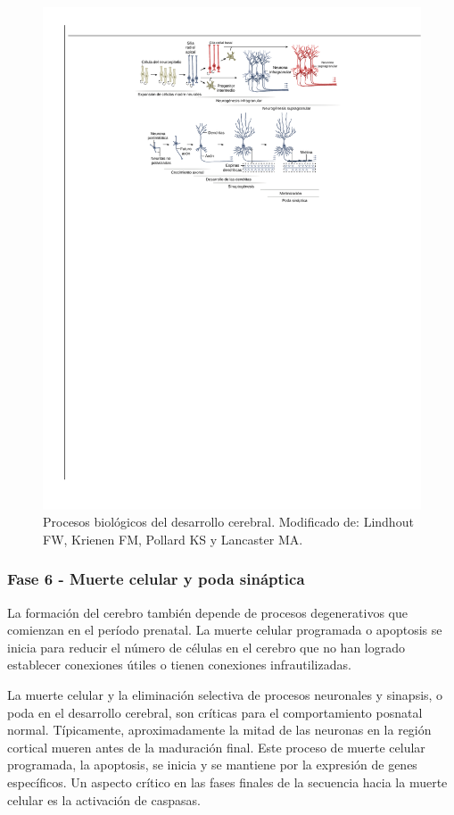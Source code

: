 \documentclass[11pt,letterpaper]{report}
\begin{document}
\begin{figure}[h]
    \centering
    \includegraphics[width=1\textwidth]{embriologiacerebral}
	\captionsetup{font=footnotesize}
    \caption{Procesos biológicos del desarrollo cerebral. Modificado de:
	Lindhout FW, Krienen FM, Pollard KS y Lancaster MA. \cite{Lindhout2024}}
    \label{fig:embriologiacerebral}
\end{figure}

\subsubsection{Fase 6 - Muerte celular y poda sináptica}
La formación del cerebro también depende de procesos degenerativos que
comienzan en el período prenatal. La muerte celular programada o apoptosis se
inicia para reducir el número de células en el cerebro que no han logrado
establecer conexiones útiles o tienen conexiones infrautilizadas.
\cite{Gibb2018}

La muerte celular y la eliminación selectiva de procesos neuronales y sinapsis,
o poda en el desarrollo cerebral, son críticas para el comportamiento posnatal
normal. Típicamente, aproximadamente la mitad de las neuronas en la región
cortical mueren antes de la maduración final. Este proceso de muerte celular
programada, la apoptosis, se inicia y se mantiene por la expresión de genes
específicos. Un aspecto crítico en las fases finales de la secuencia hacia la
muerte celular es la activación de caspasas. \cite{Polin124}
\end{document}
